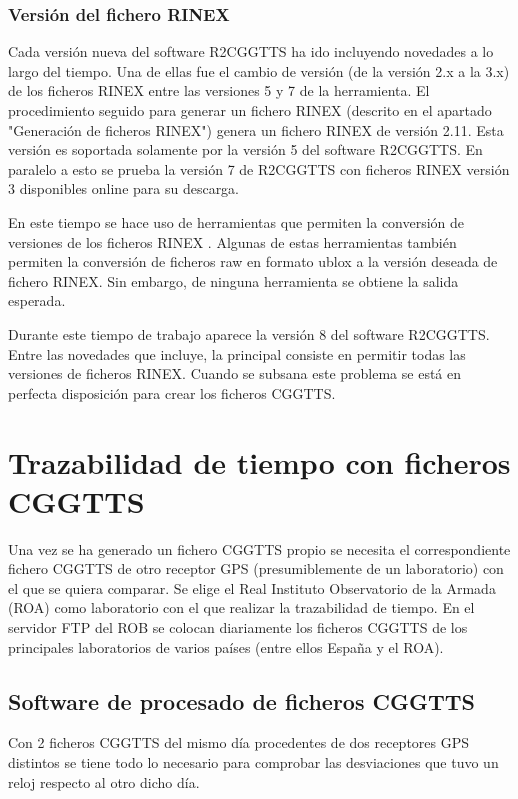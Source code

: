 \subsubsection{Versión del fichero RINEX}
Cada versión nueva del software R2CGGTTS ha ido incluyendo novedades a lo largo del tiempo. Una de ellas fue el cambio de versión (de la versión 2.x a la 3.x) de los ficheros RINEX entre las versiones 5 y 7 de la herramienta. El procedimiento seguido para generar un fichero RINEX (descrito en el apartado "Generación de ficheros RINEX") genera un fichero RINEX de versión 2.11. Esta versión es soportada solamente por la versión 5 del software R2CGGTTS. En paralelo a esto se prueba la versión 7 de R2CGGTTS con ficheros RINEX versión 3 disponibles online para su descarga.  \newline

En este tiempo se hace uso de herramientas que permiten la conversión de versiones de los ficheros RINEX \cite{gnssconverter}. Algunas de estas herramientas también permiten la conversión de ficheros raw en formato ublox a la versión deseada de fichero RINEX. Sin embargo, de ninguna herramienta se obtiene la salida esperada. \newline

Durante este tiempo de trabajo aparece la versión 8 del software R2CGGTTS. Entre las novedades que incluye, la principal consiste en permitir todas las versiones de ficheros RINEX. Cuando se subsana este problema se está en perfecta disposición para crear los ficheros CGGTTS.

\section{Trazabilidad de tiempo con ficheros CGGTTS}
Una vez se ha generado un fichero CGGTTS propio se necesita el correspondiente fichero CGGTTS de otro receptor GPS (presumiblemente de un laboratorio) con el que se quiera comparar. Se elige el Real Instituto Observatorio de la Armada (ROA) \cite{roa} como laboratorio con el que realizar la trazabilidad de tiempo. En el servidor FTP del ROB \cite{ftpro} se colocan diariamente los ficheros CGGTTS de los principales laboratorios de varios países (entre ellos España y el ROA). 

\subsection{Software de procesado de ficheros CGGTTS}
Con 2 ficheros CGGTTS del mismo día procedentes de dos receptores GPS distintos se tiene todo lo necesario para comprobar las desviaciones que tuvo un reloj respecto al otro dicho día. \newline

